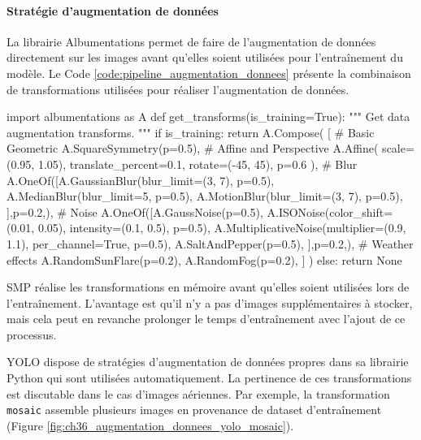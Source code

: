 \paragraph{Stratégie d'augmentation de données}
La librairie Albumentations \cite{albumentations_albumentations_nodate} permet de faire de l'augmentation de données directement sur les images avant qu'elles soient utilisées pour l'entraînement du modèle. Le Code \ref{code:pipeline_augmentation_donnees} présente la combinaison de transformations utilisées pour réaliser l'augmentation de données.

\begin{code}[H]
    \begin{pythoncode}
    import albumentations as A
    def get_transforms(is_training=True):
        """
        Get data augmentation transforms.
        """
        if is_training:
            return A.Compose(
                [
                    # Basic Geometric
                    A.SquareSymmetry(p=0.5),
                    # Affine and Perspective
                    A.Affine(
                        scale=(0.95, 1.05), translate_percent=0.1, rotate=(-45, 45), p=0.6
                    ),
                    # Blur
                    A.OneOf([A.GaussianBlur(blur_limit=(3, 7), p=0.5),
                            A.MedianBlur(blur_limit=5, p=0.5),
                            A.MotionBlur(blur_limit=(3, 7), p=0.5),
                        ],p=0.2,),
                    # Noise
                    A.OneOf([A.GaussNoise(p=0.5),
                            A.ISONoise(color_shift=(0.01, 0.05), intensity=(0.1, 0.5), p=0.5),
                            A.MultiplicativeNoise(multiplier=(0.9, 1.1), per_channel=True, p=0.5),
                            A.SaltAndPepper(p=0.5),
                        ],p=0.2,),
                    # Weather effects
                    A.RandomSunFlare(p=0.2),
                    A.RandomFog(p=0.2),
                ]
            )
        else:
            return None
    \end{pythoncode}
    \label{code:pipeline_augmentation_donnees}
\end{code}

SMP réalise les transformations en mémoire avant qu'elles soient utilisées lors de l'entraînement. L'avantage est qu'il n'y a pas d'images supplémentaires à stocker, mais cela peut en revanche prolonger le temps d'entraînement avec l'ajout de ce processus.

YOLO dispose de stratégies d'augmentation de données propres dans sa librairie Python qui sont utilisées automatiquement. La pertinence de ces transformations est discutable dans le cas d'images aériennes. Par exemple, la transformation \texttt{mosaic} assemble plusieurs images en provenance de dataset d'entraînement (Figure \ref{fig:ch36_augmentation_donnees_yolo_mosaic}).

